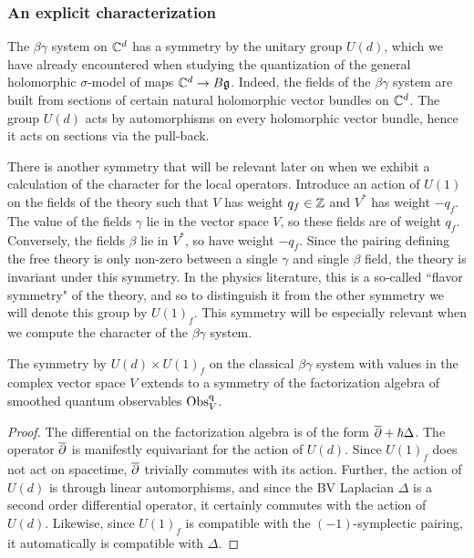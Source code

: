 \subsubsection{An explicit characterization}

The $\beta\gamma$ system on $\mathbb C^d$ has a symmetry by the unitary group $U(d)$, which we have already encountered when studying the quantization of the general holomorphic $\sigma$-model of maps $\mathbb C^d \to B \mathfrak g$. 
Indeed, the fields of the $\beta\gamma$ system are built from sections of certain natural holomorphic vector bundles on $\mathbb C^d$. 
The group $U(d)$ acts by automorphisms on every holomorphic vector bundle, hence it acts on sections via the pull-back. 

There is another symmetry that will be relevant later on when we exhibit a calculation of the character for the local operators.
Introduce an action of $U(1)$ on the fields of the theory such that $V$ has weight $q_f \in \mathbb Z$ and $V^*$ has weight $-q_f$.
The value of the fields $\gamma$ lie in the vector space $V$, so these fields are of weight $q_f$. 
Conversely, the fields $\beta$ lie in $V^*$, so have weight $-q_f$.
Since the pairing defining the free theory is only non-zero between a single $\gamma$ and single $\beta$ field, the theory is invariant under this symmetry.
In the physics literature, this is a so-called ``flavor symmetry" of the theory, and so to distinguish it from the other symmetry we will denote this group by $U(1)_f$. 
This symmetry will be especially relevant when we compute the character of the $\beta \gamma$ system.

\begin{lem}\label{lem U(d) equivariance}  The symmetry by $U(d) \times U(1)_f$ on the classical $\beta\gamma$ system with values in the complex vector space $V$ extends to a symmetry of the factorization algebra of smoothed quantum observables ${\rm Obs}^{{\rm q}}_V$.
\end{lem}

\begin{proof}
The differential on the factorization algebra is of the form $\overline{\partial} + \hbar \Delta$. 
The operator $\overline{\partial}$ is manifestly equivariant for the action of $U(d)$.
Since $U(1)_f$ does not act on spacetime, $\overline{\partial}$ trivially commutes with its action. Further, the action of $U(d)$ is through linear automorphisms, and since the BV Laplacian $\Delta$ is a second order differential operator, it certainly commutes with the action of $U(d)$. 
Likewise, since $U(1)_f$ is compatible with the $(-1)$-symplectic pairing, it automatically is compatible with $\Delta$. 
\end{proof}

